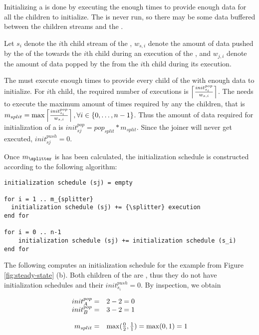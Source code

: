 Initializing a {\splitjoin} is done by executing the {\splitter}
enough times to provide enough data for all the children to
initialize.  The {\joiner} is never run, so there may be some data
buffered between the children streams and the {\joiner}.

Let $s_i$ denote the $i$th child stream of the {\splitjoin},
$w_{s,i}$ denote the amount of data pushed by the {\splitter} of the
{\splitjoin} towards the $i$th child during an execution of the
{\splitter}, and $w_{j,i}$ denote the amount of data popped by the
{\joiner} from the $i$th child during its execution.

The {\splitter} must execute enough times to provide every child of
the {\splitjoin} with enough data to initialize.  For $i$th child,
the required number of executions is $\left\lceil init^{pop}_{s_i}
\over w_{s,i} \right\rceil$.  The {\splitter} needs to execute the
maximum amount of times required by any the children, that is
$m_{split} = \max \left\lceil init^{pop}_{s_i} \over w_{s,i}
\right\rceil, \forall i \in \{0,\dots,n-1\}$.  Thus the amount of
data required for initialization of a {\splitjoin} is
$init^{pop}_{sj} = pop_{split} * m_{split}$. Since the joiner will
never get executed, $init^{push}_{sj} = 0$.

Once $m_{\splitter}$ is has been calculated, the initialization
schedule is constructed according to the following algorithm:

\begin{singlespace}
\begin{verbatim}
initialization schedule (sj) = empty

for i = 1 .. m_{splitter}
  initialization schedule (sj) += {\splitter} execution
end for

for i = 0 .. n-1
    initialization schedule (sj) += initialization schedule (s_i)
end for
\end{verbatim}
\end{singlespace}

The following computes an initialization schedule for the example
{\splitjoin}  from Figure \ref{fig:steady-state} (b). Both children
of the {\splitjoin} are {\filters}, thus they do not have
initialization schedules and their $init^{push}_{s_i} = 0$. By
inspection, we obtain

\begin{displaymath}
\begin{array}{rl}
init^{pop}_A = & 2-2=0 \\
init^{pop}_B = & 3-2 = 1 \\
\\
m_{split} = & \max({0 \over 2}, {1 \over 1}) = \max (0, 1) = 1
\end{array}
\end{displaymath}

